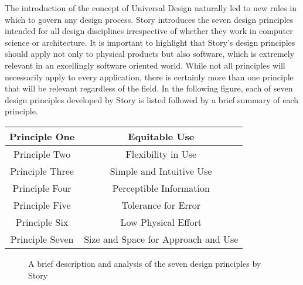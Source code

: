 The introduction of the concept of Universal Design naturally led to new rules in which to govern any design process. %
Story introduces the seven design principles \cite{sevenprinciples} intended for all design disciplines irrespective of whether they work in computer science or architecture.
It is important to highlight that Story's design principles should apply not only to physical products but also software, which is extremely relevant in an excellingly software oriented world.
While not all principles will necessarily apply to every application, there is certainly more than one principle that will be relevant regardless of the field.
In the following figure, each of seven design principles developed by Story is listed followed by a brief summary of each principle.

\begin{center}
    \begin{tabular}{ |c|c| } 
     \hline
     Principle One & Equitable Use \\
     \hline
     Principle Two & Flexibility in Use \\ 
     \hline
     Principle Three & Simple and Intuitive Use \\ 
     \hline
     Principle Four & Perceptible Information \\
     \hline 
     Principle Five & Tolerance for Error \\ 
     \hline
     Principle Six & Low Physical Effort \\ 
     \hline
     Principle Seven & Size and Space for Approach and Use \\
     \hline
    \end{tabular}
\end{center}

\begin{figure}
    \caption{A brief description and analysis of the seven design principles by Story\cite{sevenprinciples}} %
    \label{fig:DesignPrinciples}
\end{figure}

